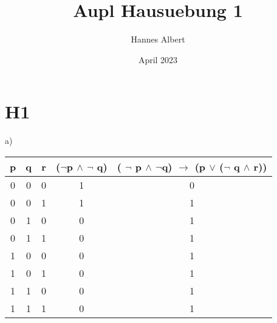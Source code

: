 \documentclass{article}
\title{Aupl Hausuebung 1}
\author{Hannes Albert}
\date{April 2023}
\begin{document}
\maketitle

\section{H1}
\setlength\leftskip{1cm}
a) \\
\begin{tabular}[h]{c|c|c|c|c}
    p & q & r & ($\neg$p $\wedge$ $\neg$ q) & ( $\neg$ p $\wedge$ $\neg$q) 
    $\rightarrow$ (p $\vee$ ($\neg$ q $\wedge$ r)) \\
    \hline
    0 & 0 & 0 & 1 & 0 \\
    0 & 0 & 1 & 1 & 1 \\
    0 & 1 & 0 & 0 & 1 \\
    0 & 1 & 1 & 0 & 1 \\
    1 & 0 & 0 & 0 & 1 \\
    1 & 0 & 1 & 0 & 1 \\
    1 & 1 & 0 & 0 & 1 \\
    1 & 1 & 1 & 0 & 1 \\
\end{tabular}
\end{document}

